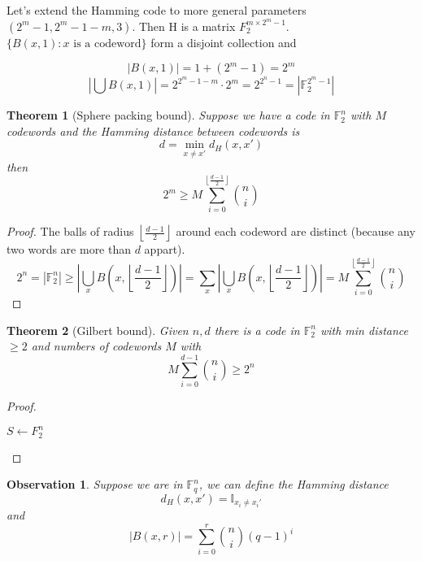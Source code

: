 \documentclass[twoside]{article}
\newtheorem{theorem}{Theorem}[section]
\newtheorem{observation}{Observation}[section]
\theoremstyle{definition} %
\def\F{\mathbb{F}}
\def\I{\mathbb{I}}
\begin{document}
Let's extend the Hamming code to more general parameters $(2^{m}-1, 2^m - 1 - m, 3)$. Then H is a matrix $F_2^{m\times2^m-1}$.$\{B(x,1) : x \text{ is a codeword}\}$ form a disjoint collection and

\[
  |B(x,1)| = 1 + (2^m - 1) = 2^m
\]
\[
  | \bigcup B(x,1) | = 2^{2^m - 1 - m} \cdot 2^m = 2^{2^n -1} = | \F_2^{2^m - 1} |
\]

\begin{theorem}[Sphere packing bound]
  Suppose we have a code in $\F_2^n$ with $M$ codewords and the Hamming distance between codewords is
  \[
    d = \min_{x\not=x'} d_H(x,x')
  \]
  then
  \[
    2^m \geq M \sum_{i=0}^{\left\lfloor \frac {d-1} 2 \right \rfloor} {n \choose i}
  \]
\end{theorem}

\begin{proof}
  The balls of radius $\left\lfloor \frac {d-1} 2 \right \rfloor$ around each codeword are distinct (because any two words are more than $d$ appart).
  \[
    2^n
    = |\F_2^n| \geq \left| \bigcup_x B\left(x, \left\lfloor \frac {d-1} 2 \right \rfloor\right) \right|
    = \sum_x \left| \bigcup_x B\left(x, \left\lfloor \frac {d-1} 2 \right \rfloor\right) \right|
    = M \sum_{i=0}^{\left\lfloor \frac {d-1} 2 \right \rfloor} {n \choose i}
  \]
\end{proof}

\begin{theorem}[Gilbert bound]
  Given $n,d$ there is a code in $\F_2^n$ with min distance $\geq 2$ and numbers of codewords $M$ with
  \[
    M\sum_{i=0}^{d-1} {n \choose i} \geq 2^n
  \]
\end{theorem}

\begin{proof}~\\
  \begin{algorithm}[H]
 $S \leftarrow F_2^n$\;
\end{algorithm}
\end{proof}

\begin{observation}
  Suppose we are in $\F_q^n$, we can define the Hamming distance
  \[
    d_H(x, x') = \I_{x_i \not = x_i'}
  \]
  and
  \[
      |B(x,r)| = \sum_{i=0}^r {n \choose i} (q-1)^i
    \]
\end{observation}
\end{document}
